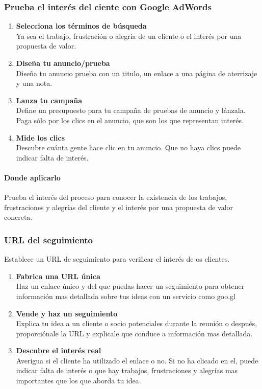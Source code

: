 \documentclass[11pt]{book}
\begin{document}
\subsubsection{Prueba el interés del ciente con Google AdWords}
\begin{enumerate}
\item \textbf{ Selecciona los términos de búsqueda }\\
Ya sea el trabajo, frustración o alegría de un cliente o el interés por una propuesta de valor. 
\item \textbf{ Diseña tu anuncio/prueba }\\
Diseña tu anuncio prueba con un titulo, un enlace a una página de aterrizaje y una nota.
\item \textbf{ Lanza tu campaña }\\
Define un presupuesto para tu campaña de pruebas de anuncio y lánzala. Paga sólo por los clics en el anuncio, que son los que representan interés.
\item \textbf{ Mide los clics }\\
Descubre cuánta gente hace clic en tu anuncio. Que no haya clics puede indicar falta de interés.
\end{enumerate}
\paragraph{Donde aplicarlo}
Prueba el interés del proceso para conocer la existencia de los trabajos, frustraciones y alegrías del cliente y el interés por una propuesta de valor concreta.
\subsubsection{URL del seguimiento}
Establece un URL de seguimiento para verificar el interés de os clientes.
\begin{enumerate}
\item \textbf{ Fabrica una URL única }\\
Haz un enlace único y del que puedas hacer un seguimiento para obtener información mas detallada sobre tus ideas con un servicio como goo.gl
\item \textbf{ Vende y haz un seguimiento }\\
Explica tu idea a un cliente o socio potenciales durante la reunión o después, proporciónale la URL y explicale que conduce a información mas detallada.
\item \textbf{ Descubre el interés real }\\
Averigua si el cliente ha utilizado el enlace o no. Si no ha clicado en el, puede indicar falta de interés o que hay trabajos, frustraciones y alegrías mas importantes que los que aborda tu idea.
\end{enumerate}
\end{document}
